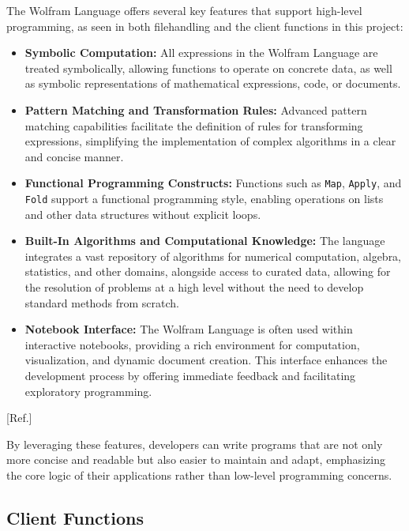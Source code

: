 The Wolfram Language offers several key features that support high-level programming, as seen in both filehandling and the client functions in this project:

\begin{itemize}
    \item \textbf{Symbolic Computation:} All expressions in the Wolfram Language are treated symbolically, allowing functions to operate on concrete data, as well as symbolic representations of mathematical expressions, code, or documents.
    
    \item \textbf{Pattern Matching and Transformation Rules:} Advanced pattern matching capabilities facilitate the definition of rules for transforming expressions, simplifying the implementation of complex algorithms in a clear and concise manner.
    
    \item \textbf{Functional Programming Constructs:} Functions such as \texttt{Map}, \texttt{Apply}, and \texttt{Fold} support a functional programming style, enabling operations on lists and other data structures without explicit loops.
    
    \item \textbf{Built-In Algorithms and Computational Knowledge:} The language integrates a vast repository of algorithms for numerical computation, algebra, statistics, and other domains, alongside access to curated data, allowing for the resolution of problems at a high level without the need to develop standard methods from scratch.
    
    \item \textbf{Notebook Interface:} The Wolfram Language is often used within interactive notebooks, providing a rich environment for computation, visualization, and dynamic document creation. This interface enhances the development process by offering immediate feedback and facilitating exploratory programming.
\end{itemize}

[Ref.]

By leveraging these features, developers can write programs that are not only more concise and readable but also easier to maintain and adapt, emphasizing the core logic of their applications rather than low-level programming concerns.

\subsection{Client Functions}

